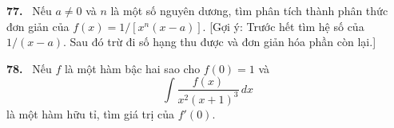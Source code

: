 \documentclass[12pt,a4paper]{article}
\newcommand{\bt}[1]{\par\smallskip\Needspace{5\baselineskip}\noindent\textbf{#1.}\ }
\begin{document}
\bt{77} Nếu $a\ne0$ và $n$ là một số nguyên dương, tìm phân tích thành phân thức đơn giản của $f(x)=1/[x^n(x-a)]$. [Gợi ý: Trước hết tìm hệ số của $1/(x-a)$. Sau đó trừ đi số hạng thu được và đơn giản hóa phần còn lại.]

\bt{78} Nếu $f$ là một hàm bậc hai sao cho $f(0)=1$ và
\[\int\frac{f(x)}{x^2(x+1)^3}\,dx\]
là một hàm hữu tỉ, tìm giá trị của $f'(0)$.
\end{document}
